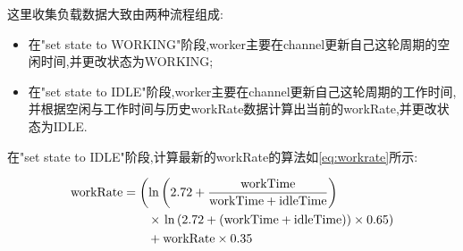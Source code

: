 \documentclass{mproj}
\begin{document}
这里收集负载数据大致由两种流程组成:
\begin{itemize}
    \item 在"set state to WORKING"阶段,worker主要在channel更新自己这轮周期的空闲时间,并更改状态为WORKING;
    \item 在"set state to IDLE"阶段,worker主要在channel更新自己这轮周期的工作时间,
          并根据空闲与工作时间与历史workRate数据计算出当前的workRate,并更改状态为IDLE.
\end{itemize}

在"set state to IDLE"阶段,计算最新的workRate的算法如\cref{eq:workrate}所示:

\begin{align}
    \text{workRate} & = \left( \ln\left( 2.72 + \frac{\text{workTime}}{\text{workTime} + \text{idleTime}} \right) \right. \notag   \\
                    & \qquad \times \left. \ln\left( 2.72 + (\text{workTime} + \text{idleTime}) \right) \times 0.65 \right) \notag \\
                    & \qquad + \text{workRate} \times 0.35 \label{eq:workrate}
\end{align}
\end{document}

